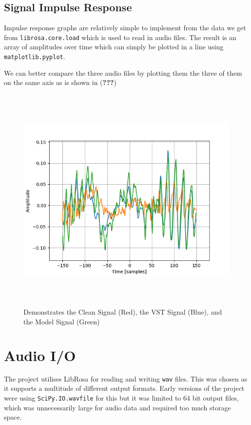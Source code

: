 \documentclass{l4proj}
\begin{document}
\subsection{Signal Impulse Response}\label{signal-impulse-response}

Impulse response graphs are relatively simple to implement from the data
we get from \texttt{librosa.core.load} which is used to read in audio
files. The result is an array of amplitudes over time which can simply
be plotted in a line using \texttt{matplotlib.pyplot}.

We can better compare the three audio files by plotting them the three
of them on the same axis as is shown in ({\textbf{???}})

\begin{figure}
\centering
\includegraphics[width=6.00000in,height=4.50000in]{images/axisshare.png}
\caption{Demonstrates the Clean Signal (Red), the VST Signal (Blue), and
the Model Signal (Green)\label{fig:axisshares}}
\end{figure}

\section{Audio I/O}\label{audio-io}

The project utilises LibRosa for reading and writing \texttt{wav} files.
This was chosen as it supports a multitude of different output formats.
Early versions of the project were using \texttt{SciPy.IO.wavfile} for
this but it was limited to 64 bit output files, which was unnecessarily
large for audio data and required too much storage space.
\end{document}

